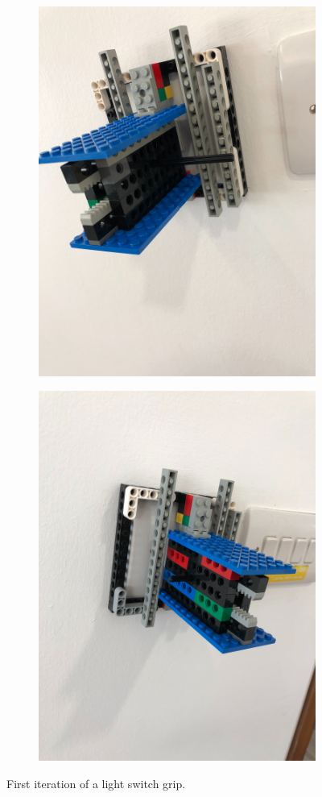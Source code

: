 \documentclass[onecolumn]{IEEEtran}
\begin{document}
\begin{figure}
    \begin{subfigure}{.5\textwidth}
      \centering
      \includegraphics[width=.8\linewidth]{light-grip-1.jpg}
    \end{subfigure}
    \begin{subfigure}{.5\textwidth}
      \centering
      \includegraphics[width=.8\linewidth]{light-grip-2.jpg}
    \end{subfigure}
    \caption{First iteration of a light switch grip.}
    \label{fig:fig}
\end{figure}
\end{document}

